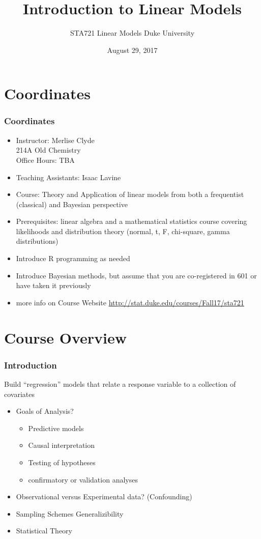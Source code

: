 \documentclass[handout]{beamer}\usepackage[]{graphicx}\usepackage[]{color}
\title{Introduction to Linear Models}
\institute{Merlise Clyde}
\author{STA721 Linear Models Duke University \\
}
\date{August 29, 2017}
\begin{document}
\maketitle
\section{Coordinates}
\begin{frame}
  \frametitle{Coordinates}
\begin{itemize}
\item Instructor: Merlise Clyde   \\ 214A Old Chemistry \\
 Office Hours: TBA \pause
\item Teaching Assistants: Isaac Lavine \pause

\item Course: Theory and Application of linear models from both a
frequentist (classical) and Bayesian perspective \pause
\item Prerequisites:   linear algebra and a mathematical statistics
  course covering likelihoods and distribution theory (normal, t, F,
  chi-square, gamma distributions) \pause
\item Introduce  R programming as needed \pause
\item Introduce  Bayesian methods, but assume that you are
  co-registered in 601 or have taken it previously \pause
\item more info on Course Website
  \url{http://stat.duke.edu/courses/Fall17/sta721}
\end{itemize}
  \end{frame}

\section{Course Overview}
\begin{frame}
  \frametitle{Introduction}
  Build ``regression'' models that relate a response variable to a
  collection of covariates  \pause
  \begin{itemize}
  \item Goals of Analysis?  \pause
    \begin{itemize}
    \item Predictive models \pause
    \item Causal interpretation \pause
    \item Testing of hypotheses \pause
    \item confirmatory  or validation analyses  \pause
    \end{itemize}
 \item Observational versus Experimental data? \pause (Confounding) \pause
 \item Sampling Schemes \pause  Generalizibility \pause
 \item Statistical Theory \pause
  \end{itemize}
\end{frame}
\end{document}
